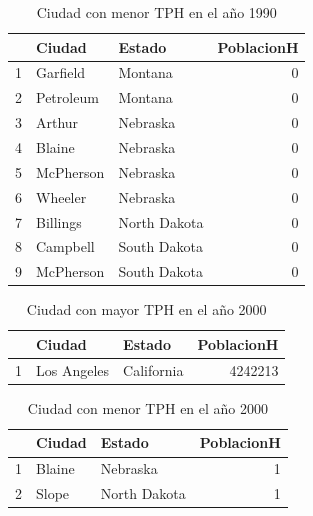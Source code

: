\documentclass[conference]{IEEEtran}\usepackage[]{graphicx}\usepackage[]{color}
\begin{document}
\begin{table}[ht]
\centering
\begin{tabular}{rllr}
  \hline
 & Ciudad & Estado & PoblacionH \\ 
  \hline
1 & Garfield & Montana &   0 \\ 
  2 & Petroleum & Montana &   0 \\ 
  3 & Arthur & Nebraska &   0 \\ 
  4 & Blaine & Nebraska &   0 \\ 
  5 & McPherson & Nebraska &   0 \\ 
  6 & Wheeler & Nebraska &   0 \\ 
  7 & Billings & North Dakota &   0 \\ 
  8 & Campbell & South Dakota &   0 \\ 
  9 & McPherson & South Dakota &   0 \\ 
   \hline
\end{tabular}
\caption{Ciudad con menor TPH en el año 1990} 
\end{table}


\begin{table}[ht]
\centering
\begin{tabular}{rllr}
  \hline
 & Ciudad & Estado & PoblacionH \\ 
  \hline
1 & Los Angeles & California & 4242213 \\ 
   \hline
\end{tabular}
\caption{Ciudad con mayor TPH en el año 2000} 
\end{table}


\begin{table}[ht]
\centering
\begin{tabular}{rllr}
  \hline
 & Ciudad & Estado & PoblacionH \\ 
  \hline
1 & Blaine & Nebraska &   1 \\ 
  2 & Slope & North Dakota &   1 \\ 
   \hline
\end{tabular}
\caption{Ciudad con menor TPH en el año 2000} 
\end{table}
\end{document}
